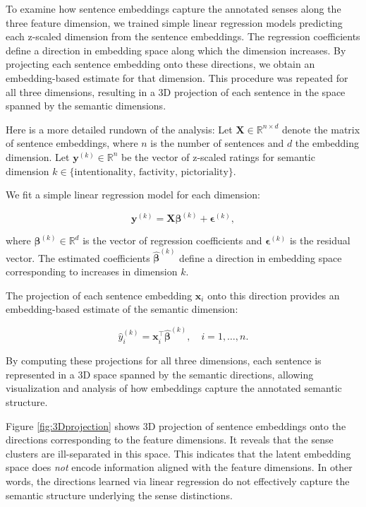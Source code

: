\documentclass[
]{article}
\begin{document}
To examine how sentence embeddings capture the annotated senses along
the three feature dimension, we trained simple linear regression models
predicting each z-scaled dimension from the sentence embeddings. The
regression coefficients define a direction in embedding space along
which the dimension increases. By projecting each sentence embedding
onto these directions, we obtain an embedding-based estimate for that
dimension. This procedure was repeated for all three dimensions,
resulting in a 3D projection of each sentence in the space spanned by
the semantic dimensions.

Here is a more detailed rundown of the analysis: Let
\(\mathbf{X} \in \mathbb{R}^{n \times d}\) denote the matrix of sentence
embeddings, where \(n\) is the number of sentences and \(d\) the
embedding dimension. Let \(\mathbf{y}^{(k)} \in \mathbb{R}^n\) be the
vector of z-scaled ratings for semantic dimension
\(k \in \{\text{intentionality, factivity, pictoriality}\}\).

We fit a simple linear regression model for each dimension:

\[
\mathbf{y}^{(k)} = \mathbf{X} \boldsymbol{\beta}^{(k)} + \boldsymbol{\epsilon}^{(k)},
\]

where \(\boldsymbol{\beta}^{(k)} \in \mathbb{R}^d\) is the vector of
regression coefficients and \(\boldsymbol{\epsilon}^{(k)}\) is the
residual vector. The estimated coefficients
\(\hat{\boldsymbol{\beta}}^{(k)}\) define a direction in embedding space
corresponding to increases in dimension \(k\).

The projection of each sentence embedding \(\mathbf{x}_i\) onto this
direction provides an embedding-based estimate of the semantic
dimension:

\[
\hat{y}^{(k)}_i = \mathbf{x}_i^\top \hat{\boldsymbol{\beta}}^{(k)}, \quad i = 1, \dots, n.
\]

By computing these projections for all three dimensions, each sentence
is represented in a 3D space spanned by the semantic directions,
allowing visualization and analysis of how embeddings capture the
annotated semantic structure.

Figure \ref{fig:3Dprojection} shows 3D projection of sentence embeddings
onto the directions corresponding to the feature dimensions. It reveals
that the sense clusters are ill-separated in this space. This indicates
that the latent embedding space does \textit{not} encode information
aligned with the feature dimensions. In other words, the directions
learned via linear regression do not effectively capture the semantic
structure underlying the sense distinctions.
\end{document}
